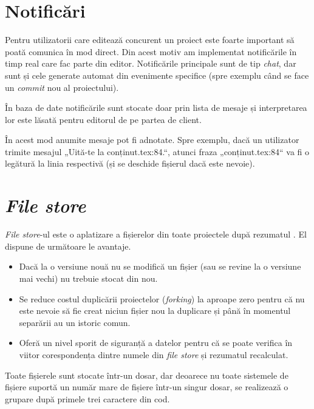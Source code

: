\documentclass[a4wide,12pt]{report}
\newcommand{\eng}[1]{\emph{#1}} %
\newcommand{\acr}[1]{{\textsmaller[1]{\textsc{#1}}}} %
\begin{document}
\section{Notificări}
\label{notificarisec}

Pentru utilizatorii care editează concurent un proiect este foarte important să
poată comunica în mod direct. Din acest motiv am implementat notificările în
timp real care fac parte din editor. Notificările principale sunt de tip
\eng{chat}, dar sunt și cele generate automat din evenimente specifice (spre
exemplu când se face un \eng{commit} nou al proiectului).

În baza de date notificările sunt stocate doar prin lista de mesaje și
interpretarea lor este lăsată pentru editorul de pe partea de client.

În acest mod anumite mesaje pot fi adnotate. Spre exemplu, dacă un utilizator
trimite mesajul „Uită-te la conținut.tex:84.“, atunci fraza „conținut.tex:84“ va
fi o legătură la linia respectivă (și se deschide fișierul dacă este nevoie).

\section{\eng{File store}}
\label{filestoresec}

\eng{File store}-ul este o aplatizare a fișierelor din toate proiectele după
rezumatul \acr{SHA1}. El dispune de următoare le avantaje.

\begin{itemize}

\item Dacă la o versiune nouă nu se modifică un fișier (sau se revine la o
versiune mai vechi) nu trebuie stocat din nou.

\item Se reduce costul duplicării proiectelor (\eng{forking}) la aproape zero
pentru că nu este nevoie să fie creat niciun fișier nou la duplicare și până în
momentul separării au un istoric comun.

\item Oferă un nivel sporit de siguranță a datelor pentru că se poate verifica
în viitor corespondența dintre numele din \eng{file store} și rezumatul
\acr{SHA1} recalculat.

\end{itemize}

Toate fișierele sunt stocate într-un dosar, dar deoarece nu toate sistemele de
fișiere suportă un număr mare de fișiere într-un singur dosar, se realizează o
grupare după primele trei caractere din cod.
\end{document}
